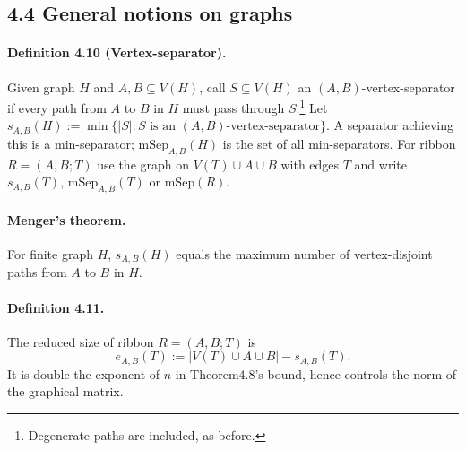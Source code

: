 \subsection*{4.4 General notions on graphs}
\paragraph{Definition 4.10 (Vertex-separator).} Given graph $H$ and $A,B\subseteq V(H)$, call $S\subseteq V(H)$ an $(A,B)$-vertex-separator if every path from $A$ to $B$ in $H$ must pass through $S$.\footnote{Degenerate paths are included, as before.} Let $s_{A,B}(H):=\min\{|S|:S\text{ is an }(A,B)\text{-vertex-separator}\}$. A separator achieving this is a min-separator; $\mathrm{mSep}_{A,B}(H)$ is the set of all min-separators. For ribbon $R=(A,B;T)$ use the graph on $V(T)\cup A\cup B$ with edges $T$ and write $s_{A,B}(T)$, $\mathrm{mSep}_{A,B}(T)$ or $\mathrm{mSep}(R)$.
\paragraph{Menger's theorem.} For finite graph $H$, $s_{A,B}(H)$ equals the maximum number of vertex-disjoint paths from $A$ to $B$ in $H$.
\paragraph{Definition 4.11.} The reduced size of ribbon $R=(A,B;T)$ is\[e_{A,B}(T):=|V(T)\cup A\cup B|-s_{A,B}(T).\tag{4.8}\]
It is double the exponent of $n$ in Theorem4.8's bound, hence controls the norm of the graphical matrix.
